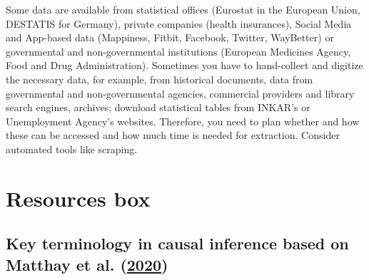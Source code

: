 \documentclass[
]{book}
\begin{document}
Some data are available from statistical offices (Eurostat in the
European Union, DESTATIS for Germany), private companies (health
insurances), Social Media and App-based data (Mappiness, Fitbit,
Facebook, Twitter, WayBetter) or governmental and non-governmental
institutions (European Medicines Agency, Food and Drug Administration).
Sometimes you have to hand-collect and digitize the necessary data, for
example, from historical documents, data from governmental and
non-governmental agencies, commercial providers and library search
engines, archives; download statistical tables from INKAR's or
Unemployment Agency's websites. Therefore, you need to plan whether and
how these can be accessed and how much time is needed for extraction.
Consider automated tools like scraping.

\hypertarget{resources-box-2}{%
\section{Resources box}\label{resources-box-2}}

\hypertarget{key-terminology-in-causal-inference-based-on-matthay_alternative_2020}{%
\subsection{\texorpdfstring{Key terminology in causal inference based on
Matthay et al.
(\protect\hyperlink{ref-matthay_alternative_2020}{2020})}{Key terminology in causal inference based on Matthay et al. (2020)}}\label{key-terminology-in-causal-inference-based-on-matthay_alternative_2020}}
\end{document}
